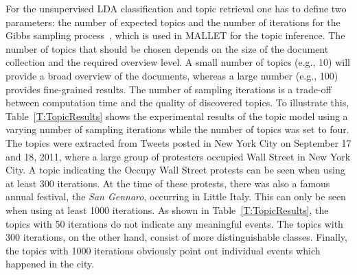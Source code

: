 For the unsupervised LDA classification and topic retrieval one has to define two parameters: the number of expected topics and the number of iterations for the Gibbs sampling process~\cite{Griff:2004:FST}, which is used in MALLET for the topic inference.
The number of topics that should be chosen depends on the size of the document collection and the 
required overview level. A small number of topics (e.g., 10) will provide a broad overview of the documents, whereas
a large number (e.g., 100) provides fine-grained results.
The number of sampling iterations is a trade-off between computation time and 
the quality of discovered topics.
To illustrate this, Table~\ref{T:TopicResults} shows the experimental results of the topic model using a varying number of sampling iterations while the number of topics was set to four.
The topics were extracted from Tweets posted in New York City
on September 17 and 18, 2011, where a large group of protesters occupied Wall Street in New York City. 
A topic indicating the Occupy Wall Street protests can be seen when using at least 300 iterations. At the time of these protests, there was also a famous annual festival, the \textit{San Gennaro}, occurring in Little Italy. This can only be seen when using at least 1000 iterations.
As shown in Table~\ref{T:TopicResults}, the topics with 50 iterations do not indicate any meaningful events.
The topics with 300 iterations, on the other hand, consist of more distinguishable classes.
Finally, the topics with 1000 iterations obviously point out individual events which happened in the city.



